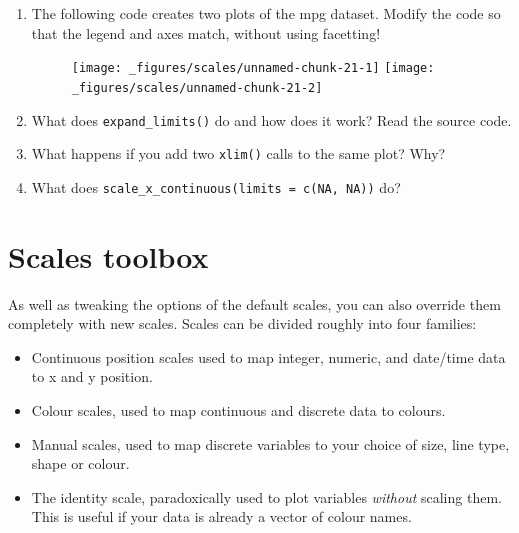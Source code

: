 \begin{enumerate}
\def\labelenumi{\arabic{enumi}.}
\item
  The following code creates two plots of the mpg dataset. Modify the
  code so that the legend and axes match, without using facetting!

\begin{Shaded}
\begin{Highlighting}[]
\StringTok{ }\NormalTok{)}
\StringTok{ }\NormalTok{)}

 \StringTok{ }\NormalTok{()}
 \StringTok{ }\NormalTok{()}
\end{Highlighting}
\end{Shaded}

  \begin{figure}[H]
    \texttt{[image: \_figures/scales/unnamed-chunk-21-1]}%
    \texttt{[image: \_figures/scales/unnamed-chunk-21-2]}
  \end{figure}
\item
  What does \texttt{expand\_limits()} do and how does it work? Read the
  source code.
\item
  What happens if you add two \texttt{xlim()} calls to the same plot?
  Why?
\item
  What does \texttt{scale\_x\_continuous(limits\ =\ c(NA,\ NA))} do?
\end{enumerate}

\hypertarget{sec:scale-details}{\section{Scales
toolbox}\label{sec:scale-details}}

As well as tweaking the options of the default scales, you can also
override them completely with new scales. Scales can be divided roughly
into four families:

\begin{itemize}
\item
  Continuous position scales used to map integer, numeric, and date/time
  data to x and y position.
\item
  Colour scales, used to map continuous and discrete data to colours.
\item
  Manual scales, used to map discrete variables to your choice of size,
  line type, shape or colour.
\item
  The identity scale, paradoxically used to plot variables
  \emph{without} scaling them. This is useful if your data is already a
  vector of colour names.
\end{itemize}

